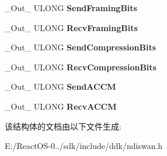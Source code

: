 \begin{DoxyCompactItemize}
\+\_\+\+Out\+\_\+ U\+L\+O\+NG {\bfseries Send\+Framing\+Bits}
\item 
\mbox{\label{struct___n_d_i_s___w_a_n___g_e_t___l_i_n_k___i_n_f_o_a3f49af5a85a0d034ea46bdb2c2530eba}} 
\+\_\+\+Out\+\_\+ U\+L\+O\+NG {\bfseries Recv\+Framing\+Bits}
\item 
\mbox{\label{struct___n_d_i_s___w_a_n___g_e_t___l_i_n_k___i_n_f_o_a0c205e5d26da50e6ebf6bc0dafe9021d}} 
\+\_\+\+Out\+\_\+ U\+L\+O\+NG {\bfseries Send\+Compression\+Bits}
\item 
\mbox{\label{struct___n_d_i_s___w_a_n___g_e_t___l_i_n_k___i_n_f_o_aff1033c710924fcbbf4c801a0c6134ef}} 
\+\_\+\+Out\+\_\+ U\+L\+O\+NG {\bfseries Recv\+Compression\+Bits}
\item 
\mbox{\label{struct___n_d_i_s___w_a_n___g_e_t___l_i_n_k___i_n_f_o_a322cf0941b1d5720537d59844f6cfd0a}} 
\+\_\+\+Out\+\_\+ U\+L\+O\+NG {\bfseries Send\+A\+C\+CM}
\item 
\mbox{\label{struct___n_d_i_s___w_a_n___g_e_t___l_i_n_k___i_n_f_o_a7ada02ac304700929d68a47a4b1ab1e9}} 
\+\_\+\+Out\+\_\+ U\+L\+O\+NG {\bfseries Recv\+A\+C\+CM}
\end{DoxyCompactItemize}


该结构体的文档由以下文件生成\+:\begin{DoxyCompactItemize}
\item 
E\+:/\+React\+O\+S-\/0../sdk/include/ddk/ndiswan.\+h\end{DoxyCompactItemize}
